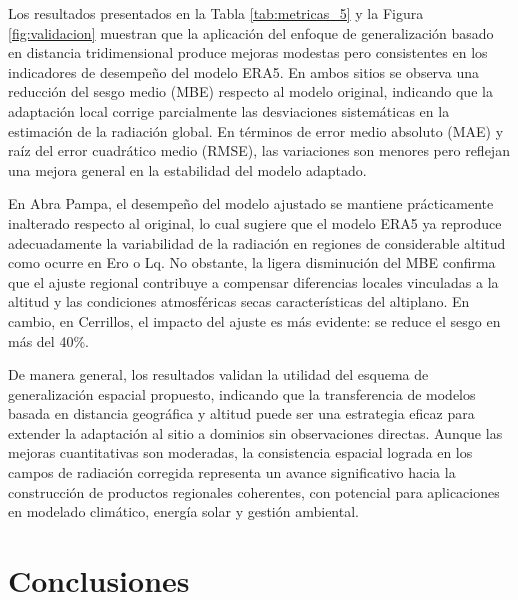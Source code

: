 \documentclass[letterpaper,12pt, twoside]{report}
\makeatletter
\let\newtitle\@title
\providecommand{\DIFdeltex}[1]{{\protect\color{red} \scriptsize #1}} %
\providecommand{\DIFaddbegin}{} %
\providecommand{\DIFaddend}{} %
\providecommand{\DIFdelbegin}{} %
\providecommand{\DIFdelend}{} %
\providecommand{\DIFdel}[1]{\texorpdfstring{\DIFdeltex{#1}}{}} %
\newcommand{\DIFscaledelfig}{0.5}
\newlength{\DIFdelgraphicswidth} %
\newlength{\DIFdelgraphicsheight} %
\newcommand{\DIFaddincludegraphics}[2][]{{\color{blue}\fbox{\DIFOincludegraphics[#1]{#2}}}} %
\newcommand{\DIFdelincludegraphics}[2][]{%
\sbox{\DIFdelgraphicsbox}{\DIFOincludegraphics[#1]{#2}}%
\settoboxwidth{\DIFdelgraphicswidth}{\DIFdelgraphicsbox} %
\settoboxtotalheight{\DIFdelgraphicsheight}{\DIFdelgraphicsbox} %
\scalebox{\DIFscaledelfig}{%
\parbox[b]{\DIFdelgraphicswidth}{\usebox{\DIFdelgraphicsbox}\\[-\baselineskip] \rule{\DIFdelgraphicswidth}{0em}}\llap{\resizebox{\DIFdelgraphicswidth}{\DIFdelgraphicsheight}{%
\setlength{\unitlength}{\DIFdelgraphicswidth}%
\begin{picture}(1,1)%
\thicklines\linethickness{2pt} %
{\color[rgb]{1,0,0}\put(0,0){\framebox(1,1){}}}%
{\color[rgb]{1,0,0}\put(0,0){\line( 1,1){1}}}%
{\color[rgb]{1,0,0}\put(0,1){\line(1,-1){1}}}%
\end{picture}%
}\hspace*{3pt}}} %
} %
\DeclareRobustCommand{\DIFaddbegin}{\DIFOaddbegin \let\includegraphics\DIFaddincludegraphics} %
\DeclareRobustCommand{\DIFaddend}{\DIFOaddend \let\includegraphics\DIFOincludegraphics} %
\DeclareRobustCommand{\DIFdelbegin}{\DIFOdelbegin \let\includegraphics\DIFdelincludegraphics} %
\DeclareRobustCommand{\DIFdelend}{\DIFOaddend \let\includegraphics\DIFOincludegraphics} %
\makeatother
\begin{document}
\DIFdel{Los resultados presentados en la Tabla \ref{tab:metricas_5} y la Figura \ref{fig:validacion} muestran que la aplicación del enfoque de generalización basado en distancia tridimensional produce mejoras modestas pero consistentes en los indicadores de desempeño del modelo ERA5. En ambos sitios se observa una reducción del sesgo medio (MBE) respecto al modelo original, indicando que la adaptación local corrige parcialmente las desviaciones sistemáticas en la estimación de la radiación global. En términos de error medio absoluto (MAE) y raíz del error cuadrático medio (RMSE), las variaciones son menores pero reflejan una mejora general en la estabilidad del modelo adaptado.
}%

\DIFdel{En Abra Pampa, el desempeño del modelo ajustado se mantiene prácticamente inalterado respecto al original, lo cual sugiere que el modelo ERA5 ya reproduce adecuadamente la variabilidad de la radiación en regiones de considerable altitud como ocurre en Ero o Lq. No obstante, la ligera disminución del MBE confirma que el ajuste regional contribuye a compensar diferencias locales vinculadas a la altitud y las condiciones atmosféricas secas características del altiplano. En cambio, en Cerrillos, el impacto del ajuste es más evidente: se reduce el sesgo en más del 40\%.
}%

\DIFdel{De manera general, los resultados validan la utilidad del esquema de generalización espacial propuesto, indicando que la transferencia de modelos basada en distancia geográfica y altitud puede ser una estrategia eficaz para extender la adaptación al sitio a dominios sin observaciones directas. Aunque las mejoras cuantitativas son moderadas, la consistencia espacial lograda en los campos de radiación corregida representa un avance significativo hacia la construcción de productos regionales coherentes, con potencial para aplicaciones en modelado climático, energía solar y gestión ambiental.
}%

\DIFdelend \DIFaddbegin  \DIFaddend %
\DIFdelbegin %
\chapter{\DIFdel{Conclusiones}}
\addtocounter{chapter}{-1}%
\end{document}
